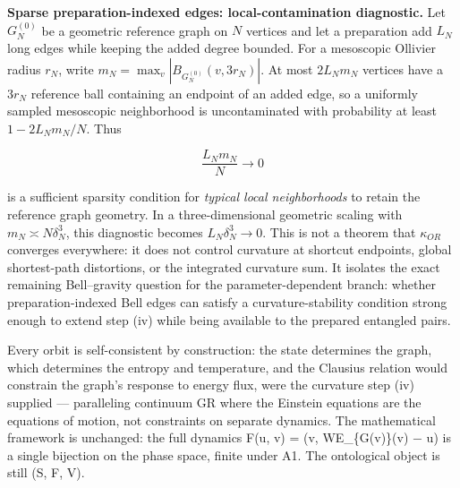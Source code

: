 \documentclass[
]{article}
\begin{document}
\textbf{Sparse preparation-indexed edges: local-contamination
diagnostic.} Let \(G_N^{(0)}\) be a geometric reference graph on \(N\)
vertices and let a preparation add \(L_N\) long edges while keeping the
added degree bounded. For a mesoscopic Ollivier radius \(r_N\), write
\(m_N=\max_v |B_{G_N^{(0)}}(v,3r_N)|\). At most \(2L_Nm_N\) vertices
have a \(3r_N\) reference ball containing an endpoint of an added edge,
so a uniformly sampled mesoscopic neighborhood is uncontaminated with
probability at least \(1-2L_Nm_N/N\). Thus

\[\frac{L_Nm_N}{N}\longrightarrow0\]

is a sufficient sparsity condition for \emph{typical local
neighborhoods} to retain the reference graph geometry. In a
three-dimensional geometric scaling with \(m_N\asymp N\delta_N^3\), this
diagnostic becomes \(L_N\delta_N^3\to0\). This is not a theorem that
\(\kappa_{OR}\) converges everywhere: it does not control curvature at
shortcut endpoints, global shortest-path distortions, or the integrated
curvature sum. It isolates the exact remaining Bell--gravity question
for the parameter-dependent branch: whether preparation-indexed Bell
edges can satisfy a curvature-stability condition strong enough to
extend step (iv) while being available to the prepared entangled pairs.

Every orbit is self-consistent by construction: the state determines the
graph, which determines the entropy and temperature, and the Clausius
relation would constrain the graph's response to energy flux, were the
curvature step (iv) supplied --- paralleling continuum GR where the
Einstein equations are the equations of motion, not constraints on
separate dynamics. The mathematical framework is unchanged: the full
dynamics F(u, v) = (v, WE\_\{G(v)\}(v) − u) is a single bijection on the
phase space, finite under A1. The ontological object is still (S, F, V).
\end{document}
